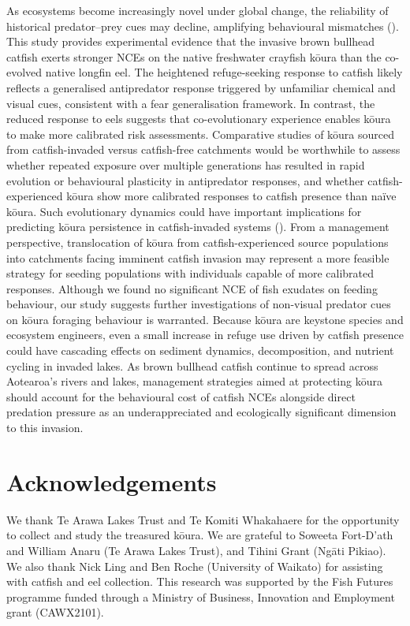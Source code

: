 \documentclass[
  letterpaper,
  DIV=11,
  numbers=noendperiod]{scrartcl}
\begin{document}
As ecosystems become increasingly novel under global change, the
reliability of historical predator--prey cues may decline, amplifying
behavioural mismatches (). This
study provides experimental evidence that the invasive brown bullhead
catfish exerts stronger NCEs on the native freshwater crayfish kōura
than the co-evolved native longfin eel. The heightened refuge-seeking
response to catfish likely reflects a generalised antipredator response
triggered by unfamiliar chemical and visual cues, consistent with a fear
generalisation framework. In contrast, the reduced response to eels
suggests that co-evolutionary experience enables kōura to make more
calibrated risk assessments. Comparative studies of kōura sourced from
catfish-invaded versus catfish-free catchments would be worthwhile to
assess whether repeated exposure over multiple generations has resulted
in rapid evolution or behavioural plasticity in antipredator responses,
and whether catfish-experienced kōura show more calibrated responses to
catfish presence than naïve kōura. Such evolutionary dynamics could have
important implications for predicting kōura persistence in
catfish-invaded systems (). From
a management perspective, translocation of kōura from
catfish-experienced source populations into catchments facing imminent
catfish invasion may represent a more feasible strategy for seeding
populations with individuals capable of more calibrated responses.
Although we found no significant NCE of fish exudates on feeding
behaviour, our study suggests further investigations of non-visual
predator cues on kōura foraging behaviour is warranted. Because kōura
are keystone species and ecosystem engineers, even a small increase in
refuge use driven by catfish presence could have cascading effects on
sediment dynamics, decomposition, and nutrient cycling in invaded lakes.
As brown bullhead catfish continue to spread across Aotearoa's rivers
and lakes, management strategies aimed at protecting kōura should
account for the behavioural cost of catfish NCEs alongside direct
predation pressure as an underappreciated and ecologically significant
dimension to this invasion.

\section*{Acknowledgements}\label{acknowledgements}

We thank Te Arawa Lakes Trust and Te Komiti Whakahaere for the
opportunity to collect and study the treasured kōura. We are grateful to
Soweeta Fort-D'ath and William Anaru (Te Arawa Lakes Trust), and Tihini
Grant (Ngāti Pikiao). We also thank Nick Ling and Ben Roche (University
of Waikato) for assisting with catfish and eel collection. This research
was supported by the Fish Futures programme funded through a Ministry of
Business, Innovation and Employment grant (CAWX2101).
\end{document}
